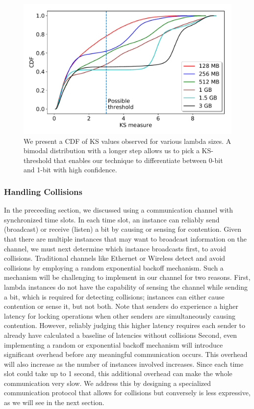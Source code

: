 \begin{figure}[!t]
  \includegraphics[width=.99\linewidth]{fig/ksvalues.pdf}
  \caption{We present a CDF of KS values observed for various lambda sizes. A bimodal distribution 
  with a longer step allows us to pick a KS-threshold that enables our technique to differentiate 
  between 0-bit and 1-bit with high confidence. 
\label{fig:ks_values}}
\end{figure}

\subsubsection{Handling Collisions}
In the preceeding section, we discussed using a communication channel with
synchronized time slots. In each time slot, an instance can reliably send
(broadcast) or receive (listen) a bit by causing or sensing for contention.
Given that there are multiple instances that may want to broadcast information
on the channel, we must next determine which instance broadcasts first, to avoid
collisions. Traditional channels like Ethernet or Wireless detect and avoid
collisions by employing a random exponential backoff mechanism.  Such a
mechanism will be challenging to implement in our channel for two
reasons. First, lambda instances do not have the capability of sensing the
channel while sending a bit, which is required for detecting collisions;
instances can either cause contention or sense it, but not both. Note that
senders do experience a higher latency for locking operations when other senders
are simultaneously causing contention. However, reliably judging this higher
latency requires each sender to already have calculated a baseline of latencies
without collisions%
Second, even implementing a random or exponential backoff mechanism
will introduce significant overhead before any meaningful communication occurs.
This overhead will also increase as the number of instances involved increases.
Since each time slot could take up to 1 second, this additional overhead can
make the whole communication very slow. We address this by designing a 
specialized communication protocol that allows for collisions but conversely is
less expressive, as we will see in the next section.



